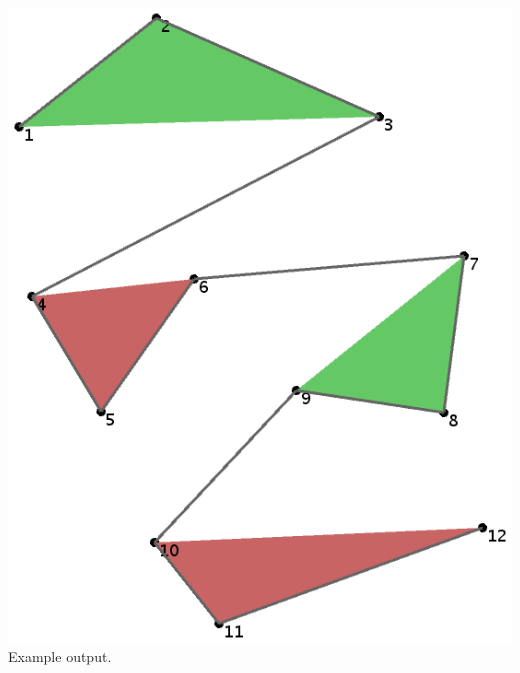 \documentclass[a4paper,12pt]{article}
\begin{document}
\begin{itemize}
\begin{minipage}[b]{0.58\textwidth}
\begin{itemize}
\end{itemize}
\end{minipage}
%
\hfill
%
\begin{minipage}[b]{0.325\textwidth}
\begin{center}
\includegraphics[width=0.975\linewidth]{../images/project0.png}
Example output.
\end{center}
\end{minipage}


\end{itemize}
\end{document}
